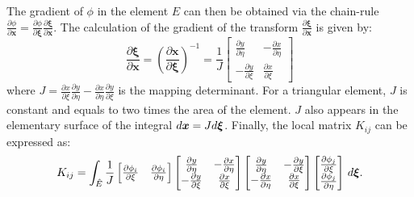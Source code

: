 \documentclass{article}
\theoremstyle{remark}
\def \d {{\rm d}}
\newcommand{\J}{J}
\newcommand{\dpartial}[2]{\frac{\partial #1}{\partial #2}}
\begin{document}
\noindent The gradient of 
$\phi$ in the element $E$ can then be obtained via the chain-rule $\dpartial{\phi}{\mathbf{x}} = \dpartial{\phi}{\boldsymbol{\xi}}\dpartial{\boldsymbol{\xi}}{\mathbf{x}}$. The calculation of the gradient of the transform $\dpartial {\boldsymbol{\xi}}{\mathbf{x}} $ is given by:
\[
  \dpartial{\boldsymbol{\xi}}{\boldsymbol{x}} = \left( \dpartial{\boldsymbol{x}}{\boldsymbol{\xi}} \right)^{-1} = \frac{1}{\J} \begin{bmatrix}
    \dpartial{y}{\eta} & -\dpartial{x}{\eta} \\
    - \dpartial{y}{\xi} & \dpartial{x}{\xi} 
  \end{bmatrix}
\]
where $\J = \dpartial{x}{\xi}\dpartial{y}{\eta}-\dpartial{x}{\eta}\dpartial{y}{\xi}$ is the mapping determinant.
For a triangular element, $\J$ is constant and equals to two times the area of the element.
$\J$ also appears in the elementary surface of the integral $\d \boldsymbol{x} = J \d \boldsymbol{\xi}$. Finally, the local matrix $K_{ij}$ can be expressed as:
\begin{equation}
  K_{ij}
  =
  \int_{\hat{E}}
 \frac{1}{\J}
  \begin{bmatrix}
    \dpartial {\phi_i}{\xi} & \dpartial{\phi_i}{\eta}
  \end{bmatrix} 
  \begin{bmatrix} 
    \dpartial y\eta & -\dpartial x\eta\\
    -\dpartial y\xi & \dpartial x\xi
  \end{bmatrix} 
  \begin{bmatrix} 
    \dpartial y\eta & -\dpartial y\xi\\
    -\dpartial x\eta & \dpartial x\xi
  \end{bmatrix} 
    \begin{bmatrix}
      \dpartial {\phi_j} \xi \\ \dpartial {\phi_j} \eta
    \end{bmatrix}
  \, \d \boldsymbol{\xi}.
  \label{eq:local_matrix}
\end{equation}
\end{document}
